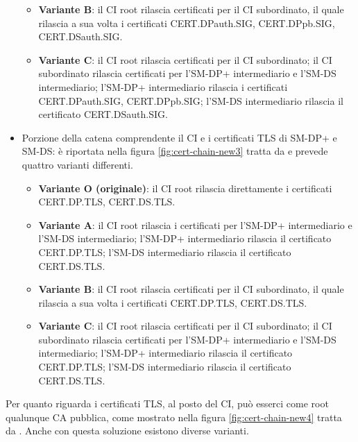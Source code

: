 \documentclass[10pt, oneside]{book}
\begin{document}
\begin{itemize}
\begin{itemize}
\item \textbf{Variante B}: il CI root rilascia certificati per il CI subordinato, il quale rilascia a sua volta i certificati CERT.DPauth.SIG, CERT.DPpb.SIG, CERT.DSauth.SIG.
\item \textbf{Variante C}: il CI root rilascia certificati per il CI subordinato; il CI subordinato rilascia certificati per l'SM-DP+ intermediario e l'SM-DS intermediario; l'SM-DP+ intermediario rilascia i certificati CERT.DPauth.SIG, CERT.DPpb.SIG; l'SM-DS intermediario rilascia il certificato CERT.DSauth.SIG.
\end{itemize}
\item Porzione della catena comprendente il CI e i certificati TLS di SM-DP+ e SM-DS: è riportata nella figura \ref{fig:cert-chain-new3} tratta da \cite{GSMA-docs-new} e prevede quattro varianti differenti.
\begin{itemize}
\item \textbf{Variante O (originale)}: il CI root rilascia direttamente i certificati CERT.DP.TLS, CERT.DS.TLS.
\item \textbf{Variante A}: il CI root rilascia i certificati per l'SM-DP+ intermediario e l'SM-DS intermediario; l'SM-DP+ intermediario rilascia il certificato CERT.DP.TLS; l'SM-DS intermediario rilascia il certificato CERT.DS.TLS.
\item \textbf{Variante B}: il CI root rilascia certificati per il CI subordinato, il quale rilascia a sua volta i certificati CERT.DP.TLS, CERT.DS.TLS.
\item \textbf{Variante C}: il CI root rilascia certificati per il CI subordinato; il CI subordinato rilascia certificati per l'SM-DP+ intermediario e l'SM-DS intermediario; l'SM-DP+ intermediario rilascia il certificato CERT.DP.TLS; l'SM-DS intermediario rilascia il certificato CERT.DS.TLS.
\end{itemize}
\end{itemize}
Per quanto riguarda i certificati TLS, al posto del CI, può esserci come root qualunque CA pubblica, come mostrato nella figura \ref{fig:cert-chain-new4} tratta da \cite{GSMA-docs-new}. Anche con questa soluzione esistono diverse varianti.
\end{document}
